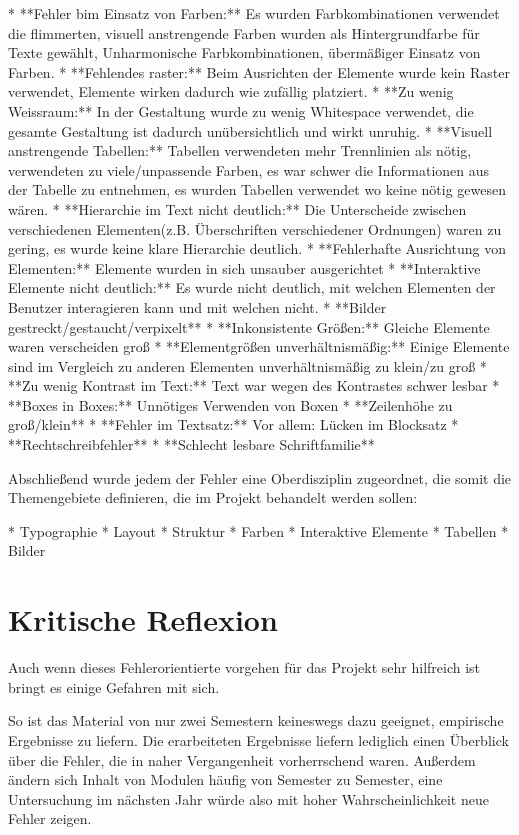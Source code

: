 * **Fehler bim Einsatz von Farben:** Es wurden Farbkombinationen verwendet die flimmerten, visuell anstrengende Farben wurden als Hintergrundfarbe für Texte gewählt, Unharmonische Farbkombinationen, übermäßiger Einsatz von Farben.
* **Fehlendes raster:** Beim Ausrichten der Elemente wurde kein Raster verwendet, Elemente wirken dadurch wie zufällig platziert.
* **Zu wenig Weissraum:** In der Gestaltung wurde zu wenig Whitespace verwendet, die gesamte Gestaltung ist dadurch unübersichtlich und wirkt unruhig.
* **Visuell anstrengende Tabellen:** Tabellen verwendeten mehr Trennlinien als nötig, verwendeten zu viele/unpassende Farben, es war schwer die Informationen aus der Tabelle zu entnehmen, es wurden Tabellen verwendet wo keine nötig gewesen wären.
* **Hierarchie im Text nicht deutlich:** Die Unterscheide zwischen verschiedenen Elementen(z.B. Überschriften verschiedener Ordnungen) waren zu gering, es wurde keine klare Hierarchie deutlich.
* **Fehlerhafte Ausrichtung von Elementen:** Elemente wurden in sich unsauber ausgerichtet
* **Interaktive Elemente nicht deutlich:** Es wurde nicht deutlich, mit welchen Elementen der Benutzer interagieren kann und mit welchen nicht.
* **Bilder gestreckt/gestaucht/verpixelt**
* **Inkonsistente Größen:** Gleiche Elemente waren verscheiden groß
* **Elementgrößen unverhältnismäßig:** Einige Elemente sind im Vergleich zu anderen Elementen unverhältnismäßig zu klein/zu groß
* **Zu wenig Kontrast im Text:** Text war wegen des Kontrastes schwer lesbar
* **Boxes in Boxes:** Unnötiges Verwenden von Boxen
* **Zeilenhöhe zu groß/klein**
* **Fehler im Textsatz:** Vor allem: Lücken im Blocksatz
* **Rechtschreibfehler**
* **Schlecht lesbare Schriftfamilie**

Abschließend wurde jedem der Fehler eine Oberdisziplin zugeordnet, die somit die Themengebiete definieren, die im Projekt behandelt werden sollen:

* Typographie
* Layout
* Struktur
* Farben
* Interaktive Elemente
* Tabellen
* Bilder


\section{Kritische Reflexion}
Auch wenn dieses Fehlerorientierte vorgehen für das Projekt sehr hilfreich ist bringt es einige Gefahren mit sich.

So ist das Material von nur zwei Semestern keineswegs dazu geeignet, empirische Ergebnisse zu liefern. Die erarbeiteten Ergebnisse liefern lediglich einen Überblick über die Fehler, die in naher Vergangenheit vorherrschend waren. Außerdem ändern sich Inhalt von Modulen häufig von Semester zu Semester, eine Untersuchung im nächsten Jahr würde also mit hoher Wahrscheinlichkeit neue Fehler zeigen.

